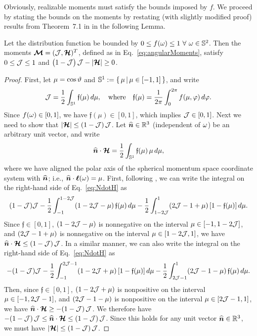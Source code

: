Obviously, realizable moments must satisfy the bounds imposed by $f$.  
We proceed by stating the bounds on the moments by restating (with slightly modified proof) results from Theorem~7.1 in \cite{banachLarecki_2017a} in the following Lemma.  
\begin{lemma}
  Let the distribution function be bounded by $0\le f(\omega) \le1~\forall~\omega\in\mathbb{S}^{2}$.  
  Then the moments $\boldsymbol{\mathcal{M}}=(\mathcal{J},\boldsymbol{\mathcal{H}})^{T}$, defined as in Eq.~\eqref{eq:angularMoments}, satisfy $0\le\mathcal{J}\le1$ and $\big(1-\mathcal{J}\big)\,\mathcal{J}-|\boldsymbol{\mathcal{H}}|\ge0$. 
  \label{lem:MomentRealizable} 
\end{lemma}
\begin{proof}
  First, let $\mu=\cos\vartheta$ and $\mathbb{S}^{1}:=\{\,\mu\,|\,\mu\in[-1,1]\,\}$, and write
  \begin{equation}
    \mathcal{J}=\frac{1}{2}\int_{\mathbb{S}^{1}}\mathfrak{f}(\mu)\,d\mu,
    \quad\text{where}\quad
    \mathfrak{f}(\mu)=\frac{1}{2\pi}\int_{0}^{2\pi}f(\mu,\varphi)\,d\varphi.  
  \end{equation}  
  Since $f(\omega)\in[0,1]$, we have $\mathfrak{f}(\mu)\in[0,1]$, which implies $\mathcal{J}\in[0,1]$.  
  Next we need to show that $|\boldsymbol{\mathcal{H}}|\le(1-\mathcal{J})\,\mathcal{J}$.  
  Let $\widehat{\boldsymbol{n}}\in\mathbb{R}^{3}$ (independent of $\omega$) be an arbitrary unit vector, and write
  \begin{equation}
    \widehat{\boldsymbol{n}}\cdot\boldsymbol{\mathcal{H}}
    =\frac{1}{2} \int_{\mathbb{S}^{1}}\mathfrak{f}(\mu)\,\mu\,d\mu,
    \label{eq:NdotH}
  \end{equation}
  where we have aligned the polar axis of the spherical momentum space coordinate system with $\widehat{\boldsymbol{n}}$; i.e., $\widehat{\boldsymbol{n}}\cdot\boldsymbol{\ell}(\omega)=\mu$.  
  First, following \cite{banachLarecki_2017a}, we can write the integral on the right-hand side of Eq.~\eqref{eq:NdotH} as
  \begin{equation*}
    (1-\mathcal{J})\mathcal{J} - \frac{1}{2}\int_{-1}^{1-2\mathcal{J}}(1-2\mathcal{J}-\mu)\,\mathfrak{f}(\mu)\,d\mu
    -\frac{1}{2}\int_{1-2\mathcal{J}}^{1}(2\mathcal{J}-1+\mu)\,[1-\mathfrak{f}(\mu)]\,d\mu.  
  \end{equation*}
  Since $\mathfrak{f}\in[0,1]$, $(1-2\mathcal{J}-\mu)$ is nonnegative on the interval $\mu\in[-1,1-2\mathcal{J}]$, and $(2\mathcal{J}-1+\mu)$ is nonnegative on the interval $\mu\in[1-2\mathcal{J},1]$, we have $\widehat{\boldsymbol{n}}\cdot\boldsymbol{\mathcal{H}}\le(1-\mathcal{J})\,\mathcal{J}$.  
  In a similar manner, we can also write the integral on the right-hand side of Eq.~\eqref{eq:NdotH} as
  \begin{equation*}
    -(1-\mathcal{J})\mathcal{J}-\frac{1}{2}\int_{-1}^{2\mathcal{J}-1}(1-2\mathcal{J}+\mu)\,[1-\mathfrak{f}(\mu)]\,d\mu
    -\frac{1}{2}\int_{2\mathcal{J}-1}^{1}(2\mathcal{J}-1-\mu)\,\mathfrak{f}(\mu)\,d\mu.  
  \end{equation*}
  Then, since $\mathfrak{f}\in[0,1]$, $(1-2\mathcal{J}+\mu)$ is nonpositive on the interval $\mu\in[-1,2\mathcal{J}-1]$, and $(2\mathcal{J}-1-\mu)$ is nonpositive on the interval $\mu\in[2\mathcal{J}-1,1]$, we have $\widehat{\boldsymbol{n}}\cdot\boldsymbol{\mathcal{H}}\ge-(1-\mathcal{J})\,\mathcal{J}$.  
  We therefore have $-(1-\mathcal{J})\,\mathcal{J}\le\widehat{\boldsymbol{n}}\cdot\boldsymbol{\mathcal{H}}\le(1-\mathcal{J})\,\mathcal{J}$.  
  Since this holds for any unit vector $\widehat{\boldsymbol{n}}\in\mathbb{R}^{3}$, we must have $|\boldsymbol{\mathcal{H}}|\le(1-\mathcal{J})\,\mathcal{J}$.  
\end{proof}

